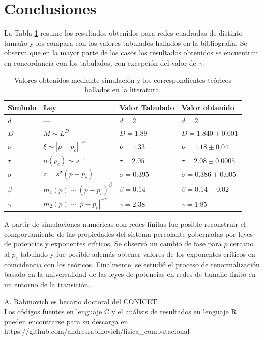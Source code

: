 \documentclass[%
 reprint,
 amsmath,amssymb,
 aps,
spanish]{revtex4-1}
\begin{document}
\section{\label{conclusions}Conclusiones}
La Tabla \ref{tabla:resumen} resume los resultados obtenidos para redes cuadradas de distinto tamaño y los compara con los valores tabulados hallados en la bibliografía. Se observa que en la mayor parte de los casos los resultados obtenidos se encuentran en concordancia con los tabulados, con excepción del valor de $\gamma$.

\begin{table}[h]
\caption{\label{tabla:resumen}%
Valores obtenidos mediante simulación y los correspondientes te\'oricos hallados en la literatura.
}
\begin{ruledtabular}
\begin{tabular}{llll}
\\[-5pt]
 S\'\i mbolo     & Ley                        & Valor Tabulado  & Valor obtenido \\
\hline
$d$             &   ---                         & $d=2$                       & $d=2$ \\
$D$             & $M\sim L^{D}$                 & $D=1.89$                    & $D=1.840\pm0.001$\\
$\nu$           & $\xi\sim|p-p_c|^{-\nu}$       & $\nu=1.33$                  & $\nu=1.18\pm0.04$\\
$\tau$          & $n(p_c)\sim s^{-\tau}$        & $\tau=2.05$                 & $\tau=2.08\pm0.0005$\\
$\sigma$        & $z=s^\sigma(p-p_c)$           & $\sigma=0.395$              & $\sigma=0.386\pm0.005$\\
$\beta$         & $m_1(p)\sim(p-p_c)^\beta$     & $\beta=0.14$                & $\beta=0.14\pm0.02$\\
$\gamma$        & $m_2(p)\sim|p-p_c|^{-\gamma}$ & $\gamma=2.38$               & $\gamma=1.85$\\
\end{tabular}
\end{ruledtabular}
\end{table}

A partir de simulaciones numéricas con redes finitas fue posible reconstruir el comportamiento de las propiedades del sistema percolante gobernadas por leyes de potencias y exponentes críticos. Se observó un cambio de fase para $p$ cercano al $p_c$ tabulado y fue posible además obtener valores de los exponentes críticos en coincidencia con los teóricos. Finalmente, se estudió el proceso de renormalización basado en la universalidad de las leyes de potencias en redes de tamaño finito en un entorno de la transición.

\begin{acknowledgments}
A. Rabinovich es becario doctoral del CONICET.\\
Los códigos fuentes en lenguaje C y el análisis de resultados en lenguaje R pueden encontrarse para su descarga en https://github.com/andresrabinovich/fisica\_computacional
\end{acknowledgments}

\appendix
\end{document}
